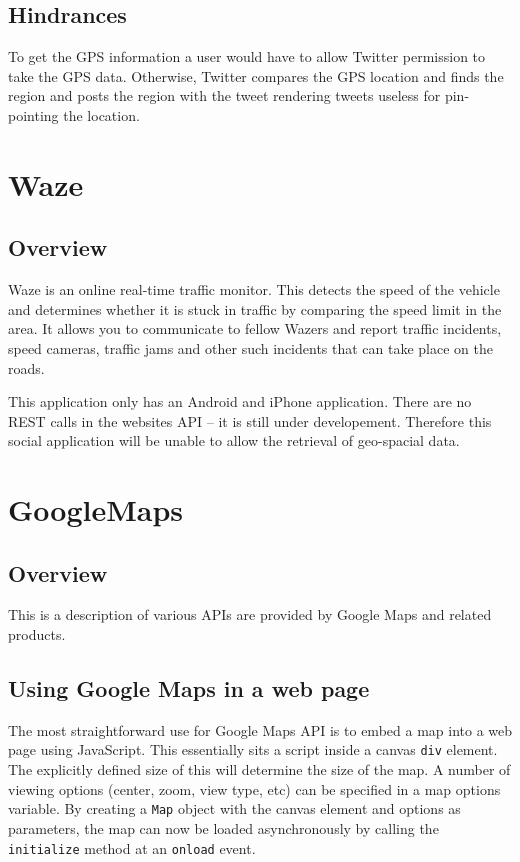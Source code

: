 \documentclass{article}
\begin{document}
\subsection{Hindrances}
To get the GPS information a user would have to allow Twitter permission to take the GPS data. Otherwise, Twitter compares the GPS location and finds the region and posts the region with the tweet rendering tweets useless for pin-pointing the location.

\section{Waze}
\subsection{Overview}
Waze is an online real-time traffic monitor. This detects the speed of the vehicle and determines whether it is stuck in traffic by comparing the speed limit in the area. It allows you to communicate to fellow Wazers and report traffic incidents, speed cameras, traffic jams and other such incidents that can take place on the roads.

This application only has an Android and iPhone application. There are no REST calls in the websites API -- it is still under developement. Therefore this social application will be unable to allow the retrieval of geo-spacial data.

\section{GoogleMaps}
\subsection{Overview}
This is a description of various APIs are provided by Google Maps and related products.
\subsection{Using Google Maps in a web page}
The most straightforward use for Google Maps API is to embed a map into a web page using JavaScript. This essentially sits a script inside a canvas \texttt{div} element. The explicitly defined size of this will determine the size of the map. A number of viewing options (center, zoom, view type, etc) can be specified in a map options variable. By creating a \texttt{Map} object with the canvas element and options as parameters, the map can now be loaded asynchronously by calling the \texttt{initialize} method at an \texttt{onload} event.
\end{document}
